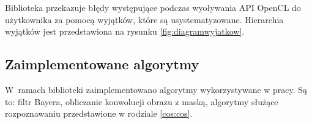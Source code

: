 Biblioteka przekazuje błędy występujące podczas wyoływania API OpenCL do użytkownika za pomocą wyjątków, które są usystematyzowane. Hierarchia wyjątków jest przedstawiona na rysunku \ref{fig:diagramwyjatkow}.

\subsection{Zaimplementowane algorytmy}
\label{subsec:algorytmy}

W~ramach biblioteki zaimplementowano algorytmy wykorzystywane w pracy. Są to: filtr Bayera, obliczanie konwolucji obrazu z maską, algorytmy służące rozpoznawaniu przedstawione w rodziale \ref{cos:cos}.
